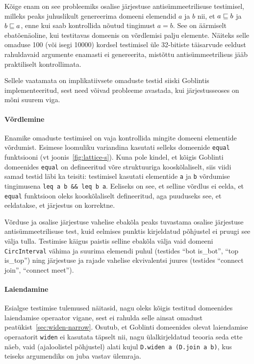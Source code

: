 \documentclass[../thesis.tex]{subfiles}
\begin{document}
Kõige enam on see probleemiks osalise järjestuse antisümmeetrilisuse testimisel, milleks peaks juhuslikult genereerima domeeni elemendid $a$ ja $b$ nii, et $a \sqsubseteq b$ ja $b \sqsubseteq a$, enne kui saab kontrollida nõutud tingimust $a = b$. See on äärmiselt ebatõenäoline, kui testitavas domeenis on võrdlemisi palju elemente. Näiteks selle omaduse 100 (või isegi 10000) kordsel testimisel üle 32-bitiste täisarvude eeldust rahuldavaid argumente enamasti ei genereerita, mistõttu antisümmeetrilisus jääb praktiliselt kontrollimata.

Sellele vaatamata on implikatiivsete omaduste testid siiski Goblintis implementeeritud, sest need võivad probleeme avastada, kui järjestusseoses on mõni suurem viga.

\paragraph{Võrdlemine}
Enamike omaduste testimisel on vaja kontrollida mingite domeeni elementide võrdumist. Esimese loomuliku variandina kasutati selleks domeenide \texttt{equal} funktsiooni (vt joonis~\ref{fig:lattice-s}). Kuna pole kindel, et kõigis Goblinti domeenides \texttt{equal} on defineeritud võre struktuuriga kooskõlaliselt, siis viidi samad testid läbi ka teisiti: testimisel kasutati elementide \texttt{a} ja \texttt{b} võrdumise tingimusena \texttt{leq a b \&\& leq b a}. Eeliseks on see, et selline võrdlus ei eelda, et \texttt{equal} funktsioon oleks kooskõlaliselt defineeritud, aga puuduseks see, et eeldatakse, et järjestus on korrektne.

Võrduse ja osalise järjestuse vahelise ebakõla peaks tuvastama osalise järjestuse antisümmeetrilisuse test, kuid eelmises punktis kirjeldatud põhjustel ei pruugi see välja tulla. Testimise käigus paistis selline ebakõla välja vaid domeeni \texttt{CircInterval} vähima ja suurima elemendi puhul (testides \enquote{bot is\_bot}, \enquote{top is\_top}) ning järjestuse ja rajade vahelise ekvivalentsi juures (testides \enquote{connect join}, \enquote{connect meet}).

\paragraph{Laiendamine}
Esialgse testimise tulemused näitasid, nagu oleks kõigis testitud domeenides laiendamise operaator vigane, sest ei rahulda selle ainsat omadust peatükist~\ref{sec:widen-narrow}. Osutub, et Goblinti domeenides olevat laiendamise operaatorit \texttt{widen} ei kasutata täpselt nii, nagu ülalkirjeldatud teooria seda ette näeb, vaid (ajaloolistel põhjustel) alati kujul \texttt{D.widen a (D.join a b)}, kus teiseks argumendiks on juba vastav ülemraja.
\end{document}
